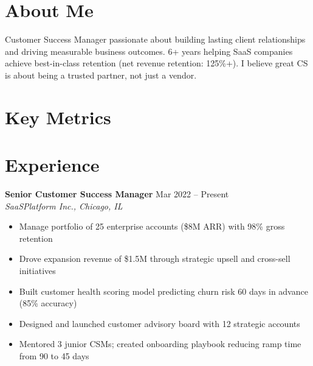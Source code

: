 \documentclass[11pt,a4paper]{article}
\begin{document}
\noindent
{}

\vspace{0.6em}

\section{About Me}
Customer Success Manager passionate about building lasting client relationships and driving measurable business outcomes. 6+ years helping SaaS companies achieve best-in-class retention (net revenue retention: 125\%+). I believe great CS is about being a trusted partner, not just a vendor.

\section{Key Metrics}
\noindent
{}

\section{Experience}

\noindent\textbf{Senior Customer Success Manager} \hfill \textcolor{accent}{Mar 2022 -- Present}\\
\textit{SaaSPlatform Inc., Chicago, IL}
\begin{itemize}[leftmargin=1.2em,nosep,label={\color{accent}\textbullet}]
\item Manage portfolio of 25 enterprise accounts (\$8M ARR) with 98\% gross retention
\item Drove expansion revenue of \$1.5M through strategic upsell and cross-sell initiatives
\item Built customer health scoring model predicting churn risk 60 days in advance (85\% accuracy)
\item Designed and launched customer advisory board with 12 strategic accounts
\item Mentored 3 junior CSMs; created onboarding playbook reducing ramp time from 90 to 45 days
\end{itemize}
\vspace{0.5em}
\end{document}
